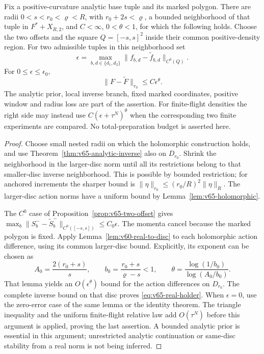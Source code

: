 \begin{theorem}
\label{thm:v65-real-stability}
Fix a positive-curvature analytic base tuple and its marked polygon.
There are radii $0<s<r_0<\varrho<R$, with
$r_0+2s<\varrho$, a bounded neighborhood of that tuple in
$F^*+X_{R,2}$, and $C<\infty$, $0<\theta<1$, for which the
following holds.  Choose the two offsets and the square
$Q=[-s,s]^2$ inside their common positive-density region.
For two admissible tuples in this neighborhood set
\[
 \epsilon=\max_{b,d\in\{d_1,d_2\}}
       \|f_{b,d}-\widetilde f_{b,d}\|_{C^0(Q)}.
\]
For $0\le\epsilon\le\epsilon_0$,
\begin{equation}\label{eq:v65-real-holder}
 \|F-\widetilde F\|_{r_0}\le C\epsilon^\theta.
\end{equation}
The analytic prior, local inverse branch, fixed marked coordinates,
positive window and radius loss are part of the assertion.
For finite-flight densities the right side may instead use
$C(\epsilon+\tau^N)^\theta$ when the corresponding two finite
experiments are compared.  No total-preparation budget is asserted here.
\end{theorem}
\begin{proof}
Choose small nested radii on which the holomorphic construction holds,
and use Theorem~\ref{thm:v65-analytic-inverse} also on $D_{r_0}$.
Shrink the neighborhood in the larger-disc norm until all its restrictions
belong to that smaller-disc inverse neighborhood.  This is possible by
bounded restriction; for anchored increments the sharper bound is
$\|\eta\|_{r_0}\le(r_0/R)^2\|\eta\|_R$.
The larger-disc action norms have a uniform bound by
Lemma~\ref{lem:v65-holomorphic}.

The $C^0$ case of Proposition~\ref{prop:v65-two-offset} gives
$\max_b\|S_b^--\widetilde S_b^-\|_{C^0([-s,s])}\le C_0\epsilon$.
The momenta cancel because the marked polygon is fixed.  Apply
Lemma~\ref{lem:v60-real-to-disc} to each holomorphic action difference,
using its common larger-disc bound.  Explicitly, its exponent can be
chosen as
\[
 A_0=\frac{2(r_0+s)}s,\qquad
 b_0=\frac{r_0+s}{\varrho-s}<1,\qquad
 \theta=\frac{\log(1/b_0)}{\log(A_0/b_0)}.
\]
That lemma yields an $O(\epsilon^\theta)$ bound for the action
differences on $D_{r_0}$.  The complete inverse bound on that disc
proves \eqref{eq:v65-real-holder}.  When $\epsilon=0$, use the
zero-error case of the same lemma or the identity theorem.
The triangle inequality and the uniform finite-flight relative law add
$O(\tau^N)$ before this argument is applied, proving the last assertion.
A bounded analytic prior is essential in this argument; unrestricted
analytic continuation or same-disc stability from a real norm is not
being inferred.
\end{proof}


